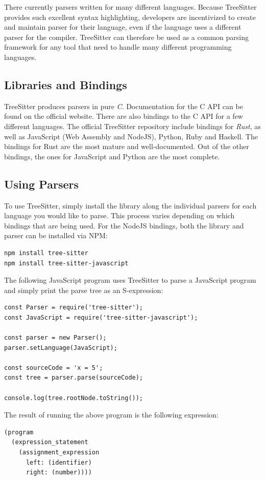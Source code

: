 \documentclass[../thesis.tex]{subfiles}
\begin{document}
There currently parsers written for many different languages.
Because TreeSitter provides such excellent syntax highlighting, developers are incentivized
to create and maintain parser for their language, even if the language
uses a different parser for the compiler.
TreeSitter can therefore be used as a common parsing framework for any tool that need to
handle many different programming languages.

\subsection{Libraries and Bindings}%
\label{sub:libraries_and_bindings}
TreeSitter produces parsers in pure \textit{C}.
Documentation for the C API can be found on the official website.
There are also bindings to the C API for a few different languages.
The official TreeSitter repository include bindings for \textit{Rust}, as well as
JavaScript (Web Assembly and NodeJS), Python, Ruby and Haskell.
The bindings for Rust are the most mature and well-documented.
Out of the other bindings, the ones for JavaScript and Python are the most complete.

\subsection{Using Parsers}%
\label{sub:using_parsers}
To use TreeSitter, simply install the library along the individual parsers for each language you would like to parse.
This process varies depending on which bindings that are being used.
For the NodeJS bindings, both the library and parser can be installed via NPM:
\begin{verbatim}
npm install tree-sitter
npm install tree-sitter-javascript
\end{verbatim}
The following JavaScript program uses TreeSitter to parse a JavaScript program and simply print the parse tree
as an S-expression:
\begin{verbatim}
const Parser = require('tree-sitter');
const JavaScript = require('tree-sitter-javascript');

const parser = new Parser();
parser.setLanguage(JavaScript);

const sourceCode = 'x = 5';
const tree = parser.parse(sourceCode);

console.log(tree.rootNode.toString());
\end{verbatim}
The result of running the above program is the following expression:
\begin{Verbatim}
(program 
  (expression_statement 
    (assignment_expression 
      left: (identifier) 
      right: (number))))
\end{Verbatim}
\end{document}
